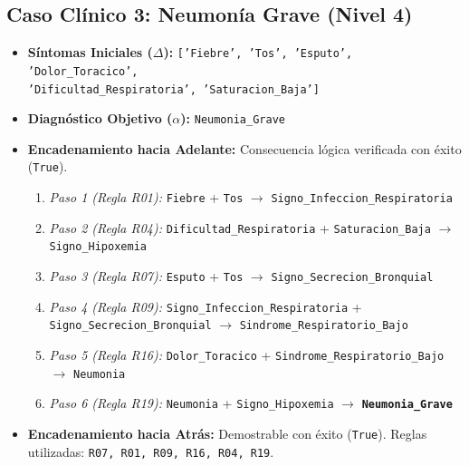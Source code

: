 \documentclass[11pt,a4paper]{article}
\begin{document}
\subsection{Caso Clínico 3: Neumonía Grave (Nivel 4)}
\begin{itemize}
    \item \textbf{Síntomas Iniciales ($\Delta$):} \texttt{['Fiebre', 'Tos', 'Esputo', 'Dolor\_Toracico',\\ 'Dificultad\_Respiratoria', 'Saturacion\_Baja']}
    \item \textbf{Diagnóstico Objetivo ($\alpha$):} \texttt{Neumonia\_Grave}
    \item \textbf{Encadenamiento hacia Adelante:} Consecuencia lógica verificada con éxito (\texttt{True}).
    \begin{enumerate}
        \item \textit{Paso 1 (Regla R01):} \texttt{Fiebre} + \texttt{Tos} $\rightarrow$ \texttt{Signo\_Infeccion\_Respiratoria}
        \item \textit{Paso 2 (Regla R04):} \texttt{Dificultad\_Respiratoria} + \texttt{Saturacion\_Baja} $\rightarrow$ \texttt{Signo\_Hipoxemia}
        \item \textit{Paso 3 (Regla R07):} \texttt{Esputo} + \texttt{Tos} $\rightarrow$ \texttt{Signo\_Secrecion\_Bronquial}
        \item \textit{Paso 4 (Regla R09):} \texttt{Signo\_Infeccion\_Respiratoria} + \texttt{Signo\_Secrecion\_Bronquial} $\rightarrow$ \texttt{Sindrome\_Respiratorio\_Bajo}
        \item \textit{Paso 5 (Regla R16):} \texttt{Dolor\_Toracico} + \texttt{Sindrome\_Respiratorio\_Bajo} $\rightarrow$ \texttt{Neumonia}
        \item \textit{Paso 6 (Regla R19):} \texttt{Neumonia} + \texttt{Signo\_Hipoxemia} $\rightarrow$ \textbf{\texttt{Neumonia\_Grave}}
    \end{enumerate}
    \item \textbf{Encadenamiento hacia Atrás:} Demostrable con éxito (\texttt{True}). Reglas utilizadas: \texttt{R07, R01, R09, R16, R04, R19}.
\end{itemize}
\end{document}
